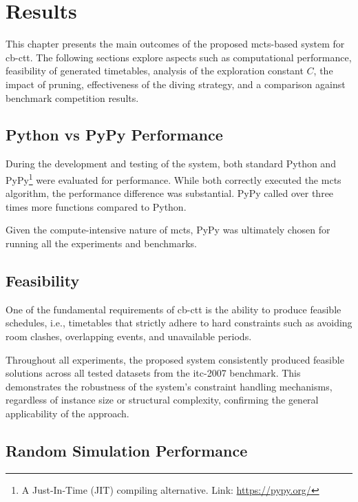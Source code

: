 \chapter{Results}

\label{Results}

This chapter presents the main outcomes of the proposed \ac{mcts}-based system for \ac{cb-ctt}. The following sections explore aspects such as computational performance, feasibility of generated timetables, analysis of the exploration constant \(C\), the impact of pruning, effectiveness of the diving strategy, and a comparison against benchmark competition results.

\section{Python vs PyPy Performance}

During the development and testing of the system, both standard Python and PyPy\footnote{A Just-In-Time (JIT) compiling alternative. Link: \url{https://pypy.org/}} were evaluated for performance. While both correctly executed the \ac{mcts} algorithm, the performance difference was substantial. PyPy called over three times more functions compared to Python.

Given the compute-intensive nature of \ac{mcts}, PyPy was ultimately chosen for running all the experiments and benchmarks.

\section{Feasibility}

One of the fundamental requirements of \ac{cb-ctt} is the ability to produce feasible schedules, i.e., timetables that strictly adhere to hard constraints such as avoiding room clashes, overlapping events, and unavailable periods.

Throughout all experiments, the proposed system consistently produced feasible solutions across all tested datasets from the \ac{itc-2007} benchmark. This demonstrates the robustness of the system's constraint handling mechanisms, regardless of instance size or structural complexity, confirming the general applicability of the approach.

\section{Random Simulation Performance}

